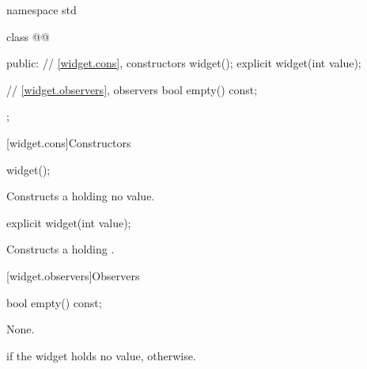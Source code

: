 \begin{codeblock}
namespace std {
  class @@ {
  public:
    // \ref{widget.cons}, constructors
    widget();
    explicit widget(int value);

    // \ref{widget.observers}, observers
    bool empty() const;
  };
}
\end{codeblock}

[widget.cons]{Constructors}

%
\begin{itemdecl}
widget();
\end{itemdecl}

\begin{itemdescr}
\pnum
\effects
Constructs a  holding no value.
\end{itemdescr}

%
\begin{itemdecl}
explicit widget(int value);
\end{itemdecl}

\begin{itemdescr}
\pnum
\effects
Constructs a  holding .
\end{itemdescr}

[widget.observers]{Observers}

%
\begin{itemdecl}
bool empty() const;
\end{itemdecl}

\begin{itemdescr}
\pnum
\effects
None.

\pnum
\returns
{} if the widget holds no value,  otherwise.
\end{itemdescr}
